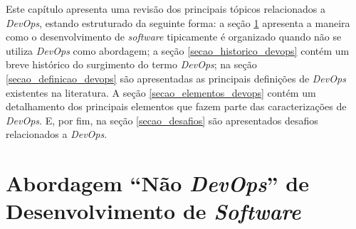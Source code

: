 \newcommand{\texCommand}[1]{\texttt{\textbackslash{#1}}}%

\newcommand{\exemplo}[1]{%
\vspace{\baselineskip}%
\noindent\fbox{\begin{minipage}{\textwidth}#1\end{minipage}}%
\\\vspace{\baselineskip}}%

\newcommand{\exemploVerbatim}[1]{%
\vspace{\baselineskip}%
\noindent\fbox{\begin{minipage}{\textwidth}%
#1\end{minipage}}%
\\\vspace{\baselineskip}}%

Este capítulo apresenta uma revisão dos principais tópicos relacionados a
\textit{DevOps}, estando estruturado da seguinte forma: a seção \ref{secao_abordagem_nao_devops}
apresenta a maneira como o desenvolvimento de \textit{software} tipicamente é
organizado quando não se utiliza \textit{DevOps} como abordagem; a seção \ref{secao_historico_devops}
contém um breve histórico do surgimento do termo \textit{DevOps}; na seção
\ref{secao_definicao_devops} são apresentadas as principais definições de
\textit{DevOps} existentes na literatura. A seção \ref{secao_elementos_devops}
contém um detalhamento dos principais elementos que fazem parte das caracterizações
de \textit{DevOps}. E, por fim, na seção \ref{secao_desafios} são apresentados
desafios relacionados a \textit{DevOps}.

\section{Abordagem ``Não \textit{DevOps}'' de Desenvolvimento de \textit{Software}}
\label{secao_abordagem_nao_devops}


